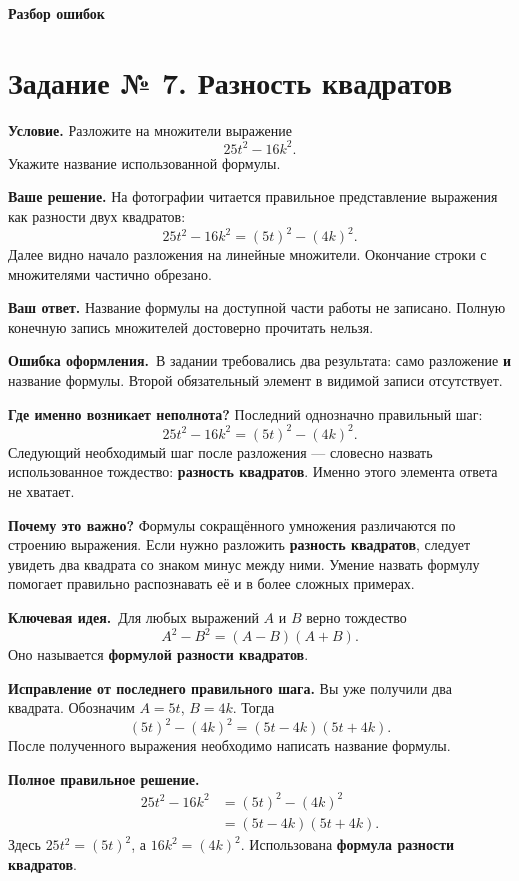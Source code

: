 \documentclass[a4paper,11pt]{article}
\newcommand{\keyidea}{\textcolor{blue!60!black}{\textbf{Ключевая идея.}}\ }
\newcommand{\errorlabel}{\textcolor{red!75!black}{\textbf{Ошибка оформления.}}\ }
\begin{document}
\clearpage
\thispagestyle{fancy}
\vspace*{0.37\textheight}
\begin{center}
{\Huge\bfseries\color{accent} Разбор ошибок}
\end{center}
\clearpage

\label{task:7}
\section*{Задание № 7. Разность квадратов}
\textbf{Условие.} Разложите на множители выражение
\[
25t^2-16k^2.
\]
Укажите название использованной формулы.

\textbf{Ваше решение.} На фотографии читается правильное представление выражения как разности двух квадратов:
\[
25t^2-16k^2=(5t)^2-(4k)^2.
\]
Далее видно начало разложения на линейные множители. Окончание строки с множителями частично обрезано.

\textbf{Ваш ответ.} Название формулы на доступной части работы не записано. Полную конечную запись множителей достоверно прочитать нельзя.

\errorlabel В задании требовались два результата: само разложение \textbf{и} название формулы. Второй обязательный элемент в видимой записи отсутствует.

\textbf{Где именно возникает неполнота?} Последний однозначно правильный шаг:
\[
25t^2-16k^2=(5t)^2-(4k)^2.
\]
Следующий необходимый шаг после разложения --- словесно назвать использованное тождество: \textbf{разность квадратов}. Именно этого элемента ответа не хватает.

\textbf{Почему это важно?} Формулы сокращённого умножения различаются по строению выражения. Если нужно разложить \textbf{разность квадратов}, следует увидеть два квадрата со знаком минус между ними. Умение назвать формулу помогает правильно распознавать её и в более сложных примерах.

\keyidea Для любых выражений $A$ и $B$ верно тождество
\[
\boxed{A^2-B^2=(A-B)(A+B).}
\]
Оно называется \textbf{формулой разности квадратов}.

\textbf{Исправление от последнего правильного шага.} Вы уже получили два квадрата. Обозначим $A=5t$, $B=4k$. Тогда
\[
(5t)^2-(4k)^2=(5t-4k)(5t+4k).
\]
После полученного выражения необходимо написать название формулы.

\textbf{Полное правильное решение.}
\begin{align*}
25t^2-16k^2
 &= (5t)^2-(4k)^2 \\
 &= (5t-4k)(5t+4k).
\end{align*}
Здесь $25t^2=(5t)^2$, а $16k^2=(4k)^2$. Использована \textbf{формула разности квадратов}.
\end{document}
